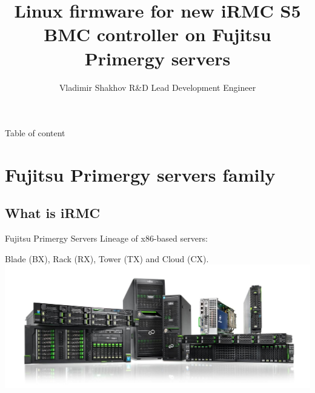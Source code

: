 \documentclass{beamer}
\author[Author, Vladimir Shakhov]{Vladimir Shakhov \newline R\&D Lead Development Engineer }
\institute[Fujitsu Technology Solutions]{ Fujitsu Technology Solutions, R\&D department, Primergy Team }
\date[\now]
\title{Linux firmware for new iRMC S5 BMC controller on Fujitsu Primergy servers}
\begin{document}

\begin{frame} 
  \titlepage 
\end{frame} 

\usebackgroundtemplate{} %

\begin{frame}{Table of content}
  \tableofcontents
\end{frame}


\section{Fujitsu Primergy servers family}
	
  \subsection{What is iRMC}
  
  \begin{frame}{Fujitsu Primergy Servers}
	Lineage of x86-based servers: 
	
	Blade (BX), Rack (RX), Tower (TX) and Cloud (CX).
	\includegraphics[scale=0.23]{primergy-servers.png}
  \end{frame}
\end{document}
